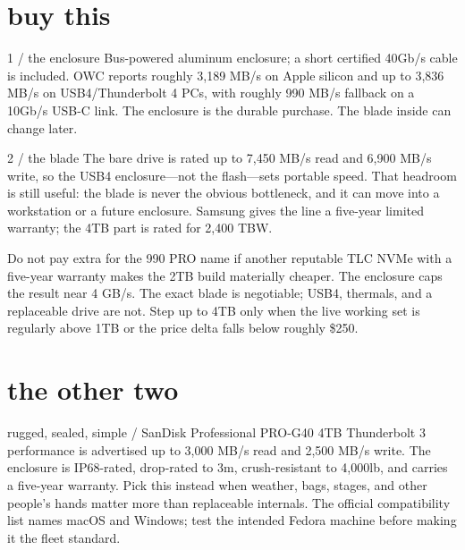 \documentclass[10pt,letterpaper]{article}
\begin{document}
\section{buy this}

\begin{gearcard}{1 / the enclosure}
Bus-powered aluminum enclosure; a short certified 40Gb/s cable is included.
OWC reports roughly 3,189 MB/s on Apple silicon and up to 3,836 MB/s on
USB4/Thunderbolt 4 PCs, with roughly 990 MB/s fallback on a 10Gb/s USB-C link.
The enclosure is the durable purchase. The blade inside can change later.
\end{gearcard}

\begin{gearcard}{2 / the blade}
The bare drive is rated up to 7,450 MB/s read and 6,900 MB/s write, so the USB4
enclosure---not the flash---sets portable speed. That headroom is still useful:
the blade is never the obvious bottleneck, and it can move into a workstation
or a future enclosure. Samsung gives the line a five-year limited warranty;
the 4TB part is rated for 2,400 TBW.
\end{gearcard}

\begin{gearwarning}
Do not pay extra for the 990 PRO name if another reputable TLC NVMe with a
five-year warranty makes the 2TB build materially cheaper. The enclosure caps
the result near 4 GB/s. The exact blade is negotiable; USB4, thermals, and a
replaceable drive are not. Step up to 4TB only when the live working set is
regularly above 1TB or the price delta falls below roughly \$250.
\end{gearwarning}

\section{the other two}

\begin{gearcard}{rugged, sealed, simple / SanDisk Professional PRO-G40 4TB}
Thunderbolt 3 performance is advertised up to 3,000 MB/s read and 2,500 MB/s
write. The enclosure is IP68-rated, drop-rated to 3m, crush-resistant to
4,000lb, and carries a five-year warranty. Pick this instead when weather,
bags, stages, and other people's hands matter more than replaceable internals.
The official compatibility list names macOS and Windows; test the intended
Fedora machine before making it the fleet standard.
\end{gearcard}
\end{document}
